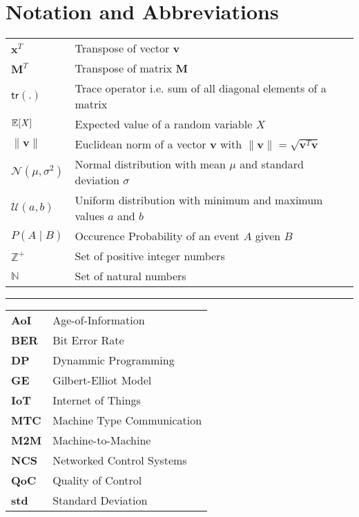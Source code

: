 \chapter{Notation and Abbreviations}

\begin{tabular}{p{2cm} l} 
$\mathbf{x}^T$ & Transpose of vector $\mathbf{v}$\\
$\mathbf{M}^T$ & Transpose of matrix $\mathbf{M}$\\
$\mathsf{tr(.)}$ & Trace operator i.e. sum of all diagonal elements of a matrix\\
$\mathbb{E}[\mathit{X}]$ & Expected value of a random variable $\mathit{X}$\\
$\|\mathbf{v}\|$ & Euclidean norm of a vector $\mathbf{v}$ with $\|\mathbf{v}\|=\sqrt{\mathbf{v} ^T\mathbf{v}}$\\
$\mathcal{N}(\mu,\sigma^2)$ & Normal distribution with mean $\mu$ and standard deviation $\sigma$\\
$\mathcal{U}(a,b)$ & Uniform distribution with minimum and maximum values $a$ and $b$\\
$P(A \mid B)$ & Occurence Probability of an event $A$ given $B$\\
$\mathbb{Z}^+$ & Set of positive integer numbers\\
$\mathbb{N}$ & Set of natural numbers\\
\end{tabular}
\vspace{1cm}

\hrule
\vspace{1cm}
  
\begin{tabular}{>{\bfseries}p{2cm} l}
AoI & Age-of-Information\\
BER & Bit Error Rate\\
DP & Dynammic Programming\\
GE & Gilbert-Elliot Model\\
IoT & Internet of Things\\
MTC & Machine Type Communication\\
M2M & Machine-to-Machine\\
NCS & Networked Control Systems\\
QoC & Quality of Control\\
std & Standard Deviation\\
\end{tabular}
